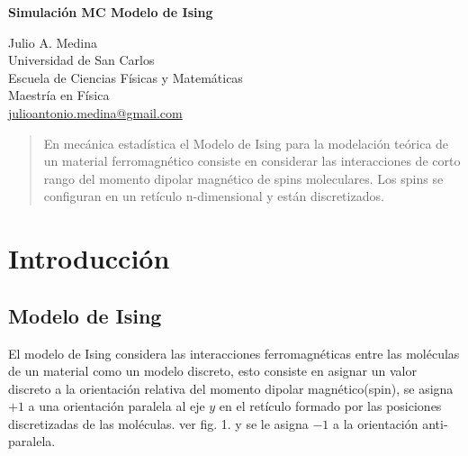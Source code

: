 \documentclass[a4paper]{article}
\begin{document}

\Large
 \begin{center}
\textbf{Simulación MC Modelo de Ising}\


\hspace{10pt}

\large
Julio A. Medina \\
\hspace{10pt}
\small  
 Universidad de San Carlos\\
Escuela de Ciencias Físicas y Matemáticas\\
Maestría en Física\\
\href{mailto:julioantonio.medina@gmail.com}{julioantonio.medina@gmail.com}\\

\end{center}

\hspace{10pt}

\begin{abstract}
En mecánica estadística el Modelo de Ising para la modelación teórica de un material ferromagnético consiste en considerar las interacciones de corto rango del momento dipolar magnético de spins moleculares. Los spins se configuran en un retículo n-dimensional y están discretizados. 

\end{abstract}

\normalsize
\section{Introducción}
\subsection{Modelo de Ising}
El modelo de Ising considera las interacciones ferromagnéticas entre las moléculas de un material como un modelo discreto, esto consiste en asignar un valor discreto a la orientación relativa del momento dipolar magnético(spin), se asigna $+1$ a una orientación paralela al eje $y$ en el retículo formado por las posiciones discretizadas de las moléculas. ver fig. 1. y se le asigna $-1$ a la orientación anti-paralela. 
\end{document}
